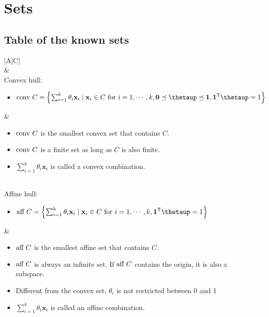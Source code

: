 \documentclass{article}
\newcommand{\trans}{\mathsf{T}}
\begin{document}
\section{Sets}
\subsection{Table of the known sets}
\begin{xltabular}{\textwidth}{|A|C|}
	\hline
	\\
	\hline
	 & \\
	\hline
	Convex hull:
	\begin{itemize}[leftmargin=*]
		\item $\textnormal{conv } C = \left\{ \sum_{i=1}^{k} \theta_i\mathbf{x}_i \mid \mathbf{x}_i \in C \textnormal{ for } i=1,\cdots, k, \mathbf{0} \preceq \boldsymbol{\thetaup} \preceq \mathbf{1}, \mathbf{1}^\trans\boldsymbol{\thetaup} = 1  \right\}$
	\end{itemize} & \vspace{-3.5ex}
	\begin{itemize}[leftmargin=*]
		\item $\textnormal{conv } C$ is the smallest convex set that contains $C$.
		\item $\textnormal{conv } C$ is a finite set as long as $C$ is also finite.
		\item \(\sum_{i=1}^{k} \theta_i\mathbf{x}_i\) is called a convex combination.
	\end{itemize}\\
	\hline
	Affine hull:
	\begin{itemize}[leftmargin=*]
		\item $\textnormal{aff } C = \left\{ \sum_{i=1}^{k} \theta_i\mathbf{x}_i \mid \mathbf{x}_i \in C \textnormal{ for } i=1,\cdots, k, \mathbf{1}^\trans\boldsymbol{\thetaup} = 1  \right\}$
	\end{itemize} & \vspace{-3.5ex}
	\begin{itemize}[leftmargin=*]
		\item $\textnormal{aff } C$ is the smallest affine set that contains $C$.
		\item $\textnormal{aff } C$ is always an infinite set. If $\textnormal{aff } C$ contains the origin, it is also a subspace.
		\item Different from the convex set, \(\theta_i\) is not restricted between 0 and 1
		\item \(\sum_{i=1}^{k} \theta_i\mathbf{x}_i\) is called an affine combination.

\end{itemize}
\end{xltabular}
\end{document}
